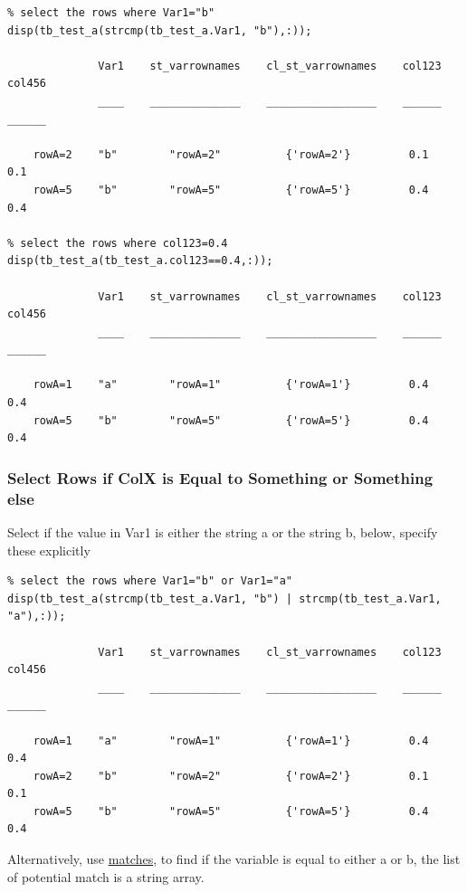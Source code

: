 \documentclass[
]{book}
\begin{document}
\begin{verbatim}
% select the rows where Var1="b"
disp(tb_test_a(strcmp(tb_test_a.Var1, "b"),:));

              Var1    st_varrownames    cl_st_varrownames    col123    col456
              ____    ______________    _________________    ______    ______

    rowA=2    "b"        "rowA=2"          {'rowA=2'}         0.1       0.1  
    rowA=5    "b"        "rowA=5"          {'rowA=5'}         0.4       0.4  

% select the rows where col123=0.4
disp(tb_test_a(tb_test_a.col123==0.4,:));

              Var1    st_varrownames    cl_st_varrownames    col123    col456
              ____    ______________    _________________    ______    ______

    rowA=1    "a"        "rowA=1"          {'rowA=1'}         0.4       0.4  
    rowA=5    "b"        "rowA=5"          {'rowA=5'}         0.4       0.4  
\end{verbatim}

\hypertarget{select-rows-if-colx-is-equal-to-something-or-something-else}{%
\subsubsection{Select Rows if ColX is Equal to Something or Something else}\label{select-rows-if-colx-is-equal-to-something-or-something-else}}

Select if the value in Var1 is either the string a or the string b,
below, specify these explicitly

\begin{verbatim}
% select the rows where Var1="b" or Var1="a"
disp(tb_test_a(strcmp(tb_test_a.Var1, "b") | strcmp(tb_test_a.Var1, "a"),:));

              Var1    st_varrownames    cl_st_varrownames    col123    col456
              ____    ______________    _________________    ______    ______

    rowA=1    "a"        "rowA=1"          {'rowA=1'}         0.4       0.4  
    rowA=2    "b"        "rowA=2"          {'rowA=2'}         0.1       0.1  
    rowA=5    "b"        "rowA=5"          {'rowA=5'}         0.4       0.4  
\end{verbatim}

Alternatively, use
\href{https://www.mathworks.com/help/matlab/ref/matches.html}{matches}, to
find if the variable is equal to either a or b, the list of potential
match is a string array.
\end{document}
